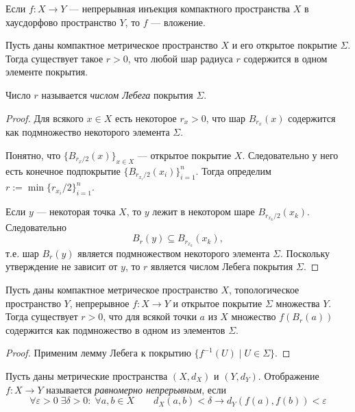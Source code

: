 \documentclass[12pt,a4paper]{article}
\begin{document}
    \begin{corollary}
        Если $f: X \to Y$ --- непрерывная инъекция компактного пространства $X$ в хаусдорфово пространство $Y$, то $f$ --- вложение.
    \end{corollary}

    \begin{lemma}[Лебега]
        Пусть даны компактное метрическое пространство $X$ и его открытое покрытие $\Sigma$. Тогда существует такое $r > 0$, что любой шар радиуса $r$ содержится в одном элементе покрытия.
    \end{lemma}

    \begin{definition}
        Число $r$ называется \emph{числом Лебега} покрытия $\Sigma$.
    \end{definition}

    \begin{proof}
        Для всякого $x \in X$ есть некоторое $r_x > 0$, что шар $B_{r_x}(x)$ содержится как подмножество некоторого элемента $\Sigma$.

        Понятно, что $\{B_{r_x/2}(x)\}_{x \in X}$ --- открытое покрытие $X$. Следовательно у него есть конечное подпокрытие $\{B_{r_{x_i}/2}(x_i)\}_{i=1}^n$. Тогда определим $r := \min \{r_{x_i}/2\}_{i=1}^n$.

        Если $y$ --- некоторая точка $X$, то $y$ лежит в некотором шаре $B_{r_{x_k}/2}(x_k)$. Следовательно
        \[B_r(y) \subseteq B_{r_{x_k}}(x_k),\]
        т.е. шар $B_r(y)$ является подмножеством некоторого элемента $\Sigma$. Поскольку утверждение не зависит от $y$, то $r$ является числом Лебега покрытия $\Sigma$.
    \end{proof}

    \begin{corollary}\label{Lebesgue-lemma-functional-corollary}
        Пусть даны компактное метрическое пространство $X$, топологическое пространство $Y$, непрерывное $f: X \to Y$ и открытое покрытие $\Sigma$ множества $Y$. Тогда существует $r > 0$, что для всякой точки $a$ из $X$ множество $f(B_r(a))$ содержится как подмножество в одном из элементов $\Sigma$.
    \end{corollary}

    \begin{proof}
        Применим лемму Лебега к покрытию $\{f^{-1}(U) \mid U \in \Sigma\}$.
    \end{proof}

    \begin{definition}
        Пусть даны метрические пространства $(X, d_X)$ и $(Y, d_Y)$. Отображение $f: X \to Y$ называется \emph{равномерно непрерывным}, если
        \[\forall \varepsilon > 0\; \exists \delta > 0:\; \forall a, b \in X\qquad d_X(a, b) < \delta \longrightarrow d_Y(f(a), f(b)) < \varepsilon\]
    \end{definition}
\end{document}
